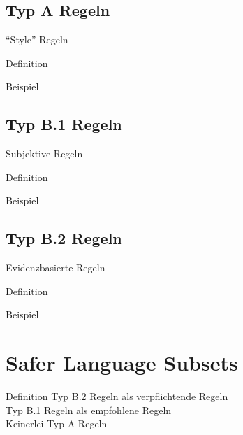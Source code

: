 \documentclass{beamer}
\begin{document}
    \subsection{Typ A Regeln}
    \label{subsec:typ-a-regeln}
    \begin{frame}{\enquote{Style}-Regeln}
        \begin{block}{Definition}

        \end{block}
        \begin{exampleblock}{Beispiel}
            
        \end{exampleblock}
    \end{frame}

    \subsection{Typ B.1 Regeln}
    \label{subsec:typ-b-1-regeln}
    \begin{frame}{Subjektive Regeln}
        \begin{block}{Definition}

        \end{block}
        \begin{exampleblock}{Beispiel}
            
        \end{exampleblock}
    \end{frame}

    \subsection{Typ B.2 Regeln}
    \label{subsec:typ-b-2-regeln}
    \begin{frame}{Evidenzbasierte Regeln}
        \begin{block}{Definition}

        \end{block}
        \begin{exampleblock}{Beispiel}
            
        \end{exampleblock}
    \end{frame}

    \section{Safer Language Subsets}
    \label{sec:safer-language-subsets}
    \begin{frame}{Definition}
        Typ B.2 Regeln als verpflichtende Regeln\\
        Typ B.1 Regeln als empfohlene Regeln\\
        Keinerlei Typ A Regeln\\
    \end{frame}
\end{document}
